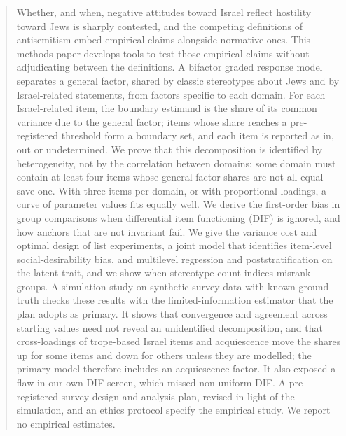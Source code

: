 \documentclass[11pt]{article}
\begin{document}
\begin{tcolorbox}[enhanced,breakable,colback=LabTint,frame hidden,boxrule=0pt,
  sharp corners,left=12pt,right=12pt,top=9pt,bottom=9pt,
  borderline west={2pt}{0pt}{LabNavy},before skip=4pt,after skip=12pt]
\begin{abstract}
Whether, and when, negative attitudes toward Israel reflect hostility toward
Jews is sharply contested, and the competing definitions of antisemitism
embed empirical claims alongside normative ones. This methods paper develops
tools to test those empirical claims without adjudicating between the
definitions. A bifactor graded response model separates a general
factor, shared by classic stereotypes about Jews and by Israel-related
statements, from factors specific to each domain. For each Israel-related
item, the boundary estimand is the share of its common variance due to the
general factor; items whose share reaches a pre-registered threshold form a
boundary set, and each item is reported as in, out or undetermined. We prove
that this decomposition is identified by heterogeneity, not by the
correlation between domains: some domain must contain at least four items
whose general-factor shares are not all equal save one. With three items per
domain, or with proportional loadings, a curve of parameter values fits
equally well. We derive the first-order bias in group comparisons when
differential item functioning (DIF) is ignored, and how anchors that are not
invariant fail. We give the variance cost and optimal design of list
experiments, a joint model that identifies item-level social-desirability
bias, and multilevel regression and poststratification on the latent trait,
and we show when stereotype-count indices misrank groups. A simulation study
on synthetic survey data with known ground truth checks these results with
the limited-information estimator that the plan adopts as primary. It shows
that convergence and agreement across starting values need not reveal an
unidentified decomposition, and that cross-loadings of trope-based Israel
items and acquiescence move the shares up for some items and down for
others unless they are modelled; the primary model therefore includes an
acquiescence factor. It also exposed a flaw in our own DIF screen,
which missed non-uniform DIF. A pre-registered survey design and analysis plan, revised in
light of the simulation, and an ethics protocol specify the empirical study.
We report no empirical estimates.
\end{abstract}
\end{tcolorbox}
\suppressfloats[t]
\end{document}
